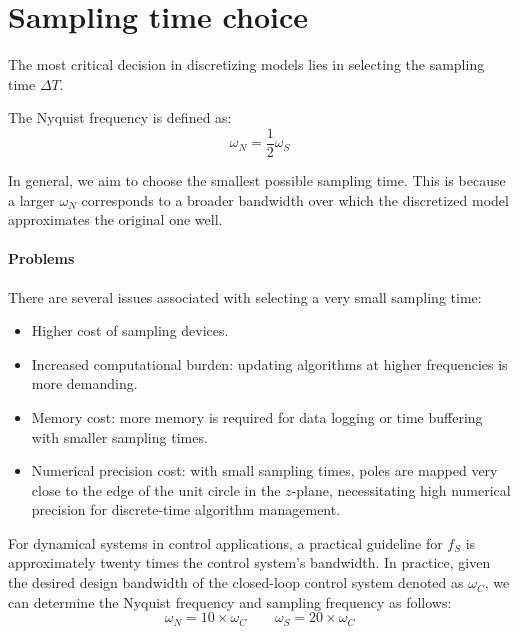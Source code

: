 \section{Sampling time choice}

The most critical decision in discretizing models lies in selecting the sampling time $\Delta T$. 
\begin{definition}
    The Nyquist frequency is defined as:
    \[\omega_N=\dfrac{1}{2}\omega_S\]
\end{definition}
In general, we aim to choose the smallest possible sampling time. 
This is because a larger $\omega_N$ corresponds to a broader bandwidth over which the discretized model approximates the original one well.

\paragraph*{Problems}
There are several issues associated with selecting a very small sampling time:
\begin{itemize}
    \item Higher cost of sampling devices.
    \item Increased computational burden: updating algorithms at higher frequencies is more demanding.
    \item Memory cost: more memory is required for data logging or time buffering with smaller sampling times.
    \item Numerical precision cost: with small sampling times, poles are mapped very close to the edge of the unit circle in the $z$-plane, necessitating high numerical precision for discrete-time algorithm management.
\end{itemize}
For dynamical systems in control applications, a practical guideline for $f_S$ is approximately twenty times the control system's bandwidth.
In practice, given the desired design bandwidth of the closed-loop control system denoted as $\omega_C$, we can determine the Nyquist frequency and sampling frequency as follows:
\[\omega_N=10 \times \omega_C \qquad \omega_S=20 \times \omega_C\]